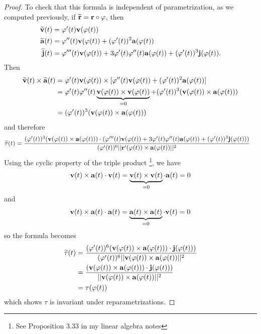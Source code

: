 \documentclass[12pt,letterpaper,reqno]{article}
\numberwithin{equation}{section}
\newcommand{\bv}{{\bf v}}
\newcommand{\ba}{{\bf a}}
\newcommand{\bbr}{{\bf r}}
\newcommand{\bj}{{\bf j}}
\begin{document}
{\begin{proof}
To check that this formula is independent of parametrization, as we computed previously, if $\widetilde{\bbr}=\bbr \circ \varphi$, then
\begin{align*}
	\widetilde{\bv}(t)&=\varphi'(t)\bv(\varphi(t)) \\
	\widetilde{\ba}(t)&=\varphi''(t)\bv(\varphi(t))+(\varphi'(t))^2\ba(\varphi(t)) \\
	\widetilde{\bj}(t)&=\varphi'''(t)\bv(\varphi(t))+3\varphi'(t)\varphi''(t)\ba(\varphi(t))+(\varphi'(t))^3\bj(\varphi(t)).
\end{align*}
Then 
\begin{align*}
	\widetilde{\bv}(t)\times \widetilde{\ba}(t)&=\varphi'(t)\bv(\varphi(t))  \times [\varphi''(t)\bv(\varphi(t))+(\varphi'(t))^2\ba(\varphi(t))] \\
	&=\varphi'(t)\varphi''(t)\underbrace{\bv(\varphi(t))\times \bv(\varphi(t))}_{=0}+(\varphi'(t))^3(\bv(\varphi(t)) \times \ba(\varphi(t))) \\
	&=(\varphi'(t))^3(\bv(\varphi(t)) \times \ba(\varphi(t))) \\
\end{align*}
and therefore
\begin{align*}
	\widetilde{\tau}(t)&=\frac{(\varphi'(t))^3 (\bv(\varphi(t)) \times \ba(\varphi(t)))\cdot (\varphi'''(t)\bv(\varphi(t))+3\varphi'(t)\varphi''(t)\ba(\varphi(t))+(\varphi'(t))^3\bj(\varphi(t)))}{(\varphi'(t))^6||\bbr'(\varphi(t)) \times \ba(\varphi(t))||^2}
\end{align*}
Using the cyclic property of the triple product \footnote{See Proposition 3.33 in my linear algebra notes}, we have 
\begin{align*}
	\bv(t) \times \ba(t) \cdot \bv(t)=\underbrace{\bv(t) \times \bv(t)}_{=0} \cdot \ba(t)  =0
\end{align*}
and 
\begin{align*}
	\bv(t) \times \ba(t) \cdot \ba(t) =\underbrace{\ba(t) \times \ba(t)}_{=0} \cdot \bv(t) =0
\end{align*}
so the formula becomes
\begin{align*}
	\widetilde{\tau}(t)&=\frac{(\varphi'(t))^6 (\bv(\varphi(t)) \times \ba(\varphi(t)))\cdot \bj(\varphi(t)))}{(\varphi'(t))^6||\bv(\varphi(t)) \times \ba(\varphi(t))||^2}\\
	&=\frac{(\bv(\varphi(t)) \times \ba(\varphi(t)))\cdot \bj(\varphi(t)))}{||\bv(\varphi(t)) \times \ba(\varphi(t))||^2} \\
	&=\tau(\varphi(t)) \\
\end{align*}
which shows $\tau$ is invariant under reparametrizations.
\end{proof}

}
\end{document}
